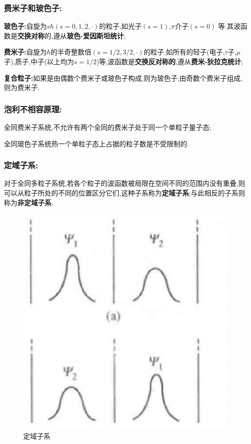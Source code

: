 \documentclass[12pt]{ctexart}
\numberwithin{equation}{subsection}
\begin{document}
	\subsubsection{ 费米子和玻色子:}
		\textbf{玻色子:}自旋为$s\hbar(s=0,1,2,\cdot)$的粒子,如光子$(s=1)$,$\pi$介子$(s=0)$ 等.其波函数是\textbf{交换对称}的,遵从\textbf{玻色-爱因斯坦统计};

		\textbf{费米子:}自旋为$\hbar$的半奇整数倍$(s=1/2,3/2,\cdot)$的粒子,如所有的轻子(电子,$\tau$子,$\mu$子),质子,中子(以上均为$s=1/2$)等,波函数是\textbf{交换反对称的},遵从\textbf{费米-狄拉克统计};

		\textbf{复合粒子:}如果是由偶数个费米子或玻色子构成,则为玻色子;由奇数个费米子组成,则为费米子.

	\subsubsection{ 泡利不相容原理:}
		全同费米子系统,不允许有两个全同的费米子处于同一个单粒子量子态;

		全同玻色子系统热一个单粒子态上占据的粒子数是不受限制的.
	\subsubsection{ 定域子系:}
		对于全同多粒子系统,若各个粒子的波函数被局限在空间不同的范围内没有重叠,则可以从粒子所处的不同的位置区分它们,这种子系称为\textbf{定域子系};与此相反的子系则称为\textbf{非定域子系}.
		\begin{figure}[htbp]
			\centering%
			\includegraphics[scale=1]{1.eps}
			\caption{定域子系}
		\label{定域子系}
		\end{figure}
\end{document}
